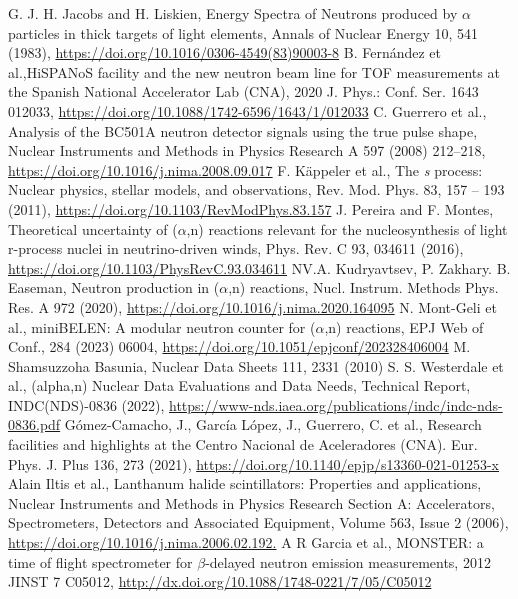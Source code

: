 \documentclass[a4paper,12pt]{report}
\newcommand{\an}{($\alpha$,n) }
\begin{document}
\begin{thebibliography}{5}
	G. J. H. Jacobs and H. Liskien, Energy Spectra of Neutrons produced by $\alpha$ particles in thick targets of light elements, Annals of Nuclear Energy 10, 541 (1983), \url{https://doi.org/10.1016/0306-4549(83)90003-8}
	B. Fernández et al.,HiSPANoS facility and the new neutron beam line for TOF measurements at the Spanish National Accelerator Lab (CNA), 2020 J. Phys.: Conf. Ser. 1643 012033, \url{https://doi.org/10.1088/1742-6596/1643/1/012033}
	C. Guerrero et al., Analysis of the BC501A neutron detector signals using the true pulse shape, Nuclear Instruments and Methods in Physics Research A 597 (2008) 212–218, \url{https://doi.org/10.1016/j.nima.2008.09.017}
	F. Käppeler et al., The \textit{s} process: Nuclear physics, stellar models, and observations, Rev. Mod. Phys. 83, 157 – 193 (2011), \url{https://doi.org/10.1103/RevModPhys.83.157}
	J. Pereira and F. Montes, Theoretical uncertainty of \an reactions relevant for the nucleosynthesis of light r-process nuclei in neutrino-driven winds, Phys. Rev. C 93, 034611 (2016), \url{https://doi.org/10.1103/PhysRevC.93.034611}
	NV.A. Kudryavtsev, P. Zakhary. B. Easeman, Neutron production in \an reactions, Nucl. Instrum. Methods Phys. Res. A 972 (2020), \url{https://doi.org/10.1016/j.nima.2020.164095}
	N. Mont-Geli et al., miniBELEN: A modular neutron counter for \an reactions, EPJ Web of Conf., 284 (2023) 06004, \url{https://doi.org/10.1051/epjconf/202328406004}
	M. Shamsuzzoha Basunia, Nuclear Data Sheets 111, 2331 (2010)
	S. S. Westerdale et al., (alpha,n) Nuclear Data Evaluations and Data Needs, Technical Report, INDC(NDS)-0836 (2022), \url{https://www-nds.iaea.org/publications/indc/indc-nds-0836.pdf}
	Gómez-Camacho, J., García López, J., Guerrero, C. et al., Research facilities and highlights at the Centro Nacional de Aceleradores (CNA). Eur. Phys. J. Plus 136, 273 (2021), \url{https://doi.org/10.1140/epjp/s13360-021-01253-x}
	Alain Iltis et al., Lanthanum halide scintillators: Properties and applications, Nuclear Instruments and Methods in Physics Research Section A: Accelerators, Spectrometers, Detectors and Associated Equipment, Volume 563, Issue 2 (2006), \url{https://doi.org/10.1016/j.nima.2006.02.192.}
	A R Garcia et al., MONSTER: a time of flight spectrometer for $\beta$-delayed neutron emission measurements, 2012 JINST 7 C05012, \url{http://dx.doi.org/10.1088/1748-0221/7/05/C05012}

\end{thebibliography}
\end{document}
